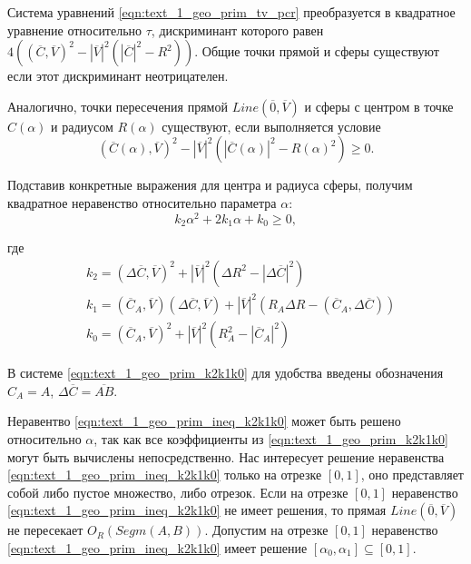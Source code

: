 Система уравнений \eqref{eqn:text_1_geo_prim_tv_pcr} преобразуется в квадратное уравнение относительно $\tau$, дискриминант которого равен $4\left((\overline{C}, \overline{V})^2 - |\overline{V}|^2 \left(|\overline{C}|^2 - R^2\right)\right)$.
Общие точки прямой и сферы существуют если этот дискриминант неотрицателен.

Аналогично, точки пересечения прямой $Line(\overline{0}, \overline{V})$ и сферы с центром в точке $C(\alpha)$ и радиусом $R(\alpha)$ существуют, если выполняется условие
\begin{equation}
	(\overline{C}(\alpha), \overline{V})^2 - |\overline{V}|^2 \left(|\overline{C}(\alpha)|^2 - R(\alpha)^2\right) \ge 0.
\end{equation}

Подставив конкретные выражения для центра и радиуса сферы, получим квадратное неравенство относительно параметра $\alpha$:
\begin{equation}\label{eqn:text_1_geo_prim_ineq_k2k1k0}
	k_2 \alpha^2 + 2 k_1 \alpha + k_0 \ge 0,
\end{equation}

где
\begin{equation}\label{eqn:text_1_geo_prim_k2k1k0}
	\begin{aligned}
		& k_2 = (\Delta \overline{C}, \overline{V})^2 + |\overline{V}|^2 \left( \Delta R^2 - |\Delta \overline{C}|^2 \right) \\
		& k_1 = (\overline{C}_A, \overline{V})(\Delta \overline{C}, \overline{V}) + |\overline{V}|^2 \left(R_A \Delta R - (\overline{C}_A, \Delta \overline{C}) \right) \\
		& k_0 = (\overline{C}_A, \overline{V})^2 + |\overline{V}|^2 \left( R_A^2 - |\overline{C}_A|^2 \right)
	\end{aligned}
\end{equation}

В системе \eqref{eqn:text_1_geo_prim_k2k1k0} для удобства введены обозначения $C_A = A$, $\Delta \overline{C} = \overline{AB}$.

Неравентво \eqref{eqn:text_1_geo_prim_ineq_k2k1k0} может быть решено относительно $\alpha$, так как все коэффициенты из \eqref{eqn:text_1_geo_prim_k2k1k0} могут быть вычислены непосредственно.
Нас интересует решение неравенства \eqref{eqn:text_1_geo_prim_ineq_k2k1k0} только на отрезке $[0,1]$, оно представляет собой либо пустое множество, либо отрезок.
Если на отрезке $[0,1]$ неравенство \eqref{eqn:text_1_geo_prim_ineq_k2k1k0} не имеет решения, то прямая $Line(\overline{0}, \overline{V})$ не пересекает $O_R(Segm(A, B))$.
Допустим на отрезке $[0,1]$ неравенство \eqref{eqn:text_1_geo_prim_ineq_k2k1k0} имеет решение $[\alpha_0, \alpha_1] \subseteq [0, 1]$.
 

